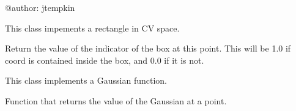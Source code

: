 \documentclass[letterpaper,10pt,english]{sphinxmanual}
\begin{document}
@author: jtempkin

\begin{fulllineitems}
\label{applications/applications.doc:basisFunctions.Box}
This class impements a rectangle in CV space.

\begin{fulllineitems}
\label{applications/applications.doc:basisFunctions.Box.indicator}
Return the value of the indicator of the box at this point.  This will be 1.0 if coord is contained inside the box, and 0.0 if it is not.

\end{fulllineitems}


\end{fulllineitems}


\begin{fulllineitems}
\label{applications/applications.doc:basisFunctions.Gaussian}
This class implements a Gaussian function.

\begin{fulllineitems}
\label{applications/applications.doc:basisFunctions.Gaussian.indicator}
Function that returns the value of the Gaussian at a point.

\end{fulllineitems}


\end{fulllineitems}

\end{document}
